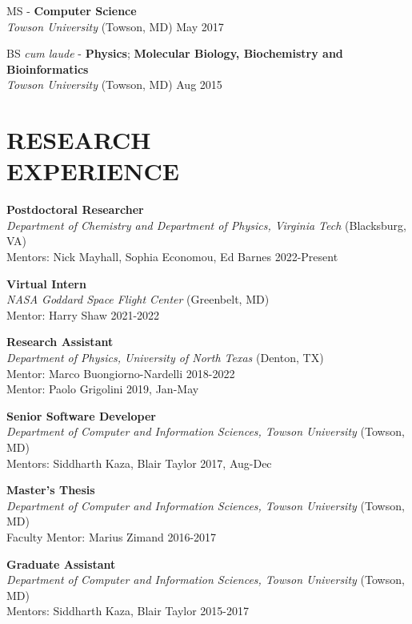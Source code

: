 \documentclass[marginmode, 10pt]{res} %
\begin{document}
\begin{resume}
MS - \textbf{Computer Science} \\
\textit{Towson University} (Towson, MD) \hfill May 2017

BS \textit{cum laude} - \textbf{Physics}; \textbf{Molecular Biology, Biochemistry and Bioinformatics} \\
\textit{Towson University} (Towson, MD) \hfill Aug 2015


\section{\small{RESEARCH\\EXPERIENCE}}

\textbf{Postdoctoral Researcher} \\
\textit{Department of Chemistry and Department of Physics, Virginia Tech} (Blacksburg, VA) \\
Mentors: Nick Mayhall, Sophia Economou, Ed Barnes \hfill 2022-Present

\textbf{Virtual Intern} \\
\textit{NASA Goddard Space Flight Center} (Greenbelt, MD) \\
Mentor: Harry Shaw \hfill 2021-2022

\textbf{Research Assistant} \\
\textit{Department of Physics, University of North Texas} (Denton, TX) \\
Mentor: Marco Buongiorno-Nardelli \hfill 2018-2022 \\
Mentor: Paolo Grigolini \hfill 2019, Jan-May

\textbf{Senior Software Developer} \\
\textit{Department of Computer and Information Sciences, Towson University} (Towson, MD) \\
Mentors: Siddharth Kaza, Blair Taylor \hfill 2017, Aug-Dec

\textbf{Master's Thesis} \\
\textit{Department of Computer and Information Sciences, Towson University} (Towson, MD) \\
Faculty Mentor: Marius Zimand \hfill 2016-2017

\textbf{Graduate Assistant} \\
\textit{Department of Computer and Information Sciences, Towson University} (Towson, MD) \\
Mentors: Siddharth Kaza, Blair Taylor \hfill 2015-2017


\end{resume}
\end{document}
